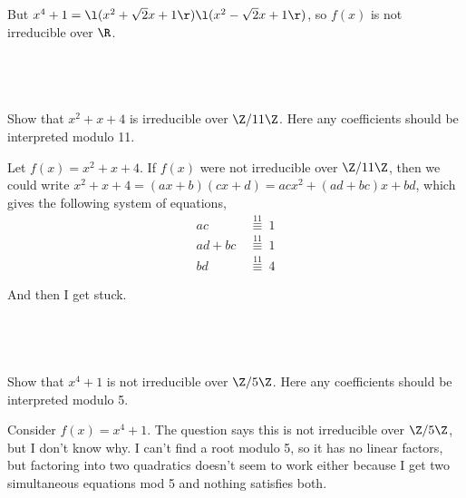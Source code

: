 \documentclass[a4paper]{article}
\begin{document}
But $x^4 + 1 = \l(x^2 + \sqrt2 x + 1\r) \l(x^2 - \sqrt2 x + 1\r)$, so $f(x)$ is not irreducible over $\R$.

\subsection{~} %

\begin{questionbody}
Show that $x^2 + x + 4$ is irreducible over $\Z / 11\Z$. Here any coefficients should be interpreted modulo 11.
\end{questionbody}

Let $f(x) = x^2 + x + 4$. If $f(x)$ were not irreducible over $\Z / 11 \Z$, then we could write $x^2 + x + 4 = (ax + b) (cx + d) = acx^2 + (ad + bc)x + bd$, which gives the following system of equations, \begin{align*}
    ac &\stackrel{11}{\ \equiv\ } 1 \\
    ad + bc &\stackrel{11}{\ \equiv\ } 1 \\
    bd &\stackrel{11}{\ \equiv\ } 4
\end{align*}

And then I get stuck.

\newpage
\subsection{~} %

\begin{questionbody}
Show that $x^4 + 1$ is not irreducible over $\Z / 5\Z$. Here any coefficients should be interpreted modulo 5.
\end{questionbody}

Consider $f(x) = x^4 + 1$. The question says this is not irreducible over $\Z / 5 \Z$, but I don't know why. I can't find a root modulo 5, so it has no linear factors, but factoring into two quadratics doesn't seem to work either because I get two simultaneous equations mod 5 and nothing satisfies both.
\end{document}
